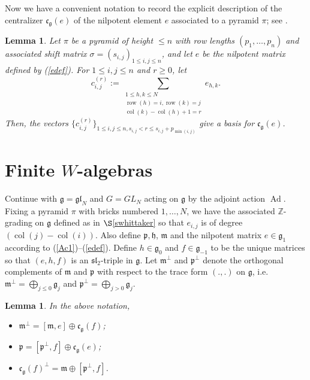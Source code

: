 \documentclass[twoside,12pt,reqno]{amsart}
\newtheorem{Lemma}[Proposition]{Lemma}
\def\row{\operatorname{row}}
\def\Ad{\operatorname{Ad}}
\def\col{\operatorname{col}}
\def\Z{{\mathbb Z}}
\begin{document}
Now we have a convenient notation to record 
the explicit description of the centralizer 
$\mathfrak{c}_{\mathfrak{g}}(e)$ of the nilpotent element
$e$ associated to a pyramid $\pi$;
see \cite[IV.1.6]{SS}.

\begin{Lemma}\label{centbase}
Let $\pi$ be a pyramid of height $\leq n$ with row
lengths $(p_1,\dots,p_n)$ and associated shift
matrix $\sigma = (s_{i,j})_{1 \leq i,j \leq n}$, and
let $e$ be the nilpotent matrix defined by (\ref{edef}).
For $1 \leq i,j \leq n$ and $r \geq 0$, let
$$
c_{i,j}^{(r)} := \sum_{\substack{1 \leq h,k \leq N \\ 
\row(h) = i, \row(k) = j \\ \col(k) - \col(h) +1 = r}} e_{h,k}.
$$
Then, 
the vectors $\{c_{i,j}^{(r)}\}_{1 \leq i,j \leq n, s_{i,j} < r \leq s_{i,j}+
p_{\min(i,j)}}$ give a basis for
$\mathfrak{c}_{\mathfrak{g}}(e)$.
\end{Lemma}

\section{Finite $W$-algebras}\label{sslice}

Continue with $\mathfrak{g} = \mathfrak{gl}_N$
and $G = GL_N$ acting on $\mathfrak{g}$
by the adjoint action $\Ad$.
Fixing a pyramid $\pi$ with 
bricks numbered $1,\dots,N$, we have the associated $\Z$-grading
on $\mathfrak{g}$ defined as in 
$\S$\ref{swhittaker} so that $e_{i,j}$ is of degree
$(\col(j)-\col(i))$.
Also define $\mathfrak{p},
\mathfrak{h}$, $\mathfrak{m}$ and the nilpotent
matrix $e \in \mathfrak{g}_1$ according to
(\ref{Ac1})--(\ref{edef}).
Define $h \in \mathfrak{g}_0$ and $f \in \mathfrak{g}_{-1}$ 
to be the unique matrices so that
$(e,h,f)$ is an $\mathfrak{sl}_2$-triple in $\mathfrak{g}$.
Let $\mathfrak{m}^\perp$ and $\mathfrak{p}^\perp$
denote the orthogonal complements of $\mathfrak{m}$ and $\mathfrak{p}$ 
with respect to the trace form
$(.,.)$ on $\mathfrak{g}$,
i.e. $\mathfrak{m}^\perp = \bigoplus_{j \leq 0} \mathfrak{g}_j$
and $\mathfrak{p}^\perp = \bigoplus_{j > 0} \mathfrak{g}_j$.

\begin{Lemma}\label{handy}
In the above notation,
\begin{itemize}
\item[(i)] 
$\mathfrak{m}^\perp = [\mathfrak{m},e] \oplus \mathfrak{c}_{\mathfrak{g}}(f)$;
\item[(ii)] 
$\mathfrak{p} = [\mathfrak{p}^\perp,f] \oplus \mathfrak{c}_{\mathfrak{g}}(e)$;
\item[(iii)]
$\mathfrak{c}_{\mathfrak{g}}(f)^\perp = \mathfrak{m}\oplus
[\mathfrak{p}^\perp,f]$.
\end{itemize}
\end{Lemma}
\end{document}
